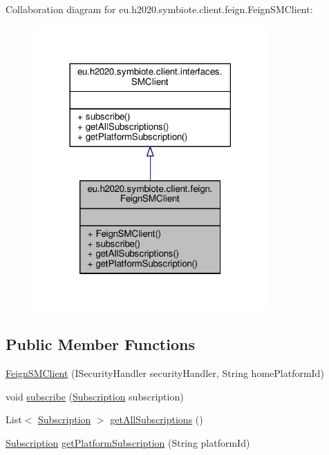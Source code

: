 Collaboration diagram for eu.\+h2020.\+symbiote.\+client.\+feign.\+Feign\+S\+M\+Client\+:\nopagebreak
\begin{figure}[H]
\begin{center}
\leavevmode
\includegraphics[width=254pt]{classeu_1_1h2020_1_1symbiote_1_1client_1_1feign_1_1FeignSMClient__coll__graph}
\end{center}
\end{figure}
\subsection*{Public Member Functions}
\begin{DoxyCompactItemize}
\item 
\hyperlink{classeu_1_1h2020_1_1symbiote_1_1client_1_1feign_1_1FeignSMClient_a6d4f54ee587c930e8ad45093b4cceec7}{Feign\+S\+M\+Client} (I\+Security\+Handler security\+Handler, String home\+Platform\+Id)
\item 
void \hyperlink{classeu_1_1h2020_1_1symbiote_1_1client_1_1feign_1_1FeignSMClient_a0eeaef7f9775704b578f5d3101f28b1f}{subscribe} (\hyperlink{classeu_1_1h2020_1_1symbiote_1_1cloud_1_1model_1_1internal_1_1Subscription}{Subscription} subscription)
\item 
List$<$ \hyperlink{classeu_1_1h2020_1_1symbiote_1_1cloud_1_1model_1_1internal_1_1Subscription}{Subscription} $>$ \hyperlink{classeu_1_1h2020_1_1symbiote_1_1client_1_1feign_1_1FeignSMClient_a1a7e9bd000f939df425066692a5ccca4}{get\+All\+Subscriptions} ()
\item 
\hyperlink{classeu_1_1h2020_1_1symbiote_1_1cloud_1_1model_1_1internal_1_1Subscription}{Subscription} \hyperlink{classeu_1_1h2020_1_1symbiote_1_1client_1_1feign_1_1FeignSMClient_a6d8bf2b5d12dcd5db1239f376cd93365}{get\+Platform\+Subscription} (String platform\+Id)
\end{DoxyCompactItemize}



